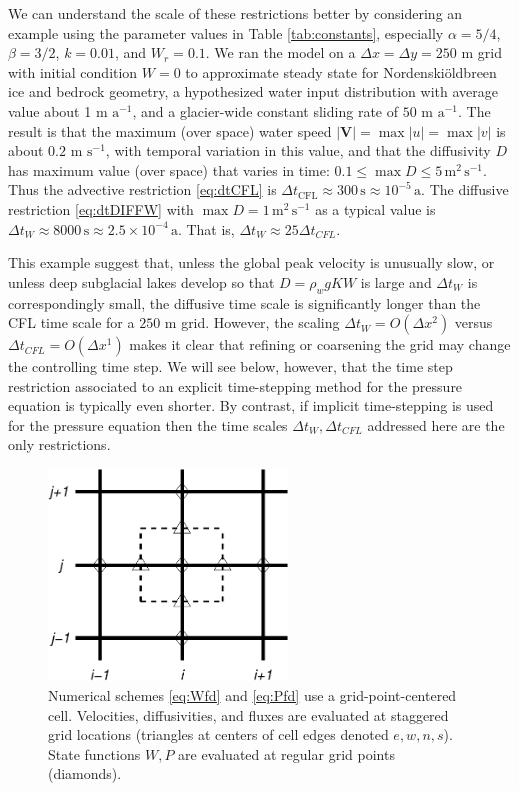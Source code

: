 \documentclass[11pt,final]{amsart}
\newcommand\bV{\mathbf{V}}
\newcommand{\Nbreen}{Nordenski\"oldbreen\xspace}
\begin{document}
We can understand the scale of these restrictions better by considering an example using the parameter values in Table \ref{tab:constants}, especially $\alpha=5/4$, $\beta=3/2$, $k=0.01$, and $W_r=0.1$.  We ran the model on a $\Delta x = \Delta y = 250$ m grid with initial condition $W=0$ to approximate steady state for \Nbreen ice and bedrock geometry, a hypothesized water input distribution with average value about 1 m $\text{a}^{-1}$, and a glacier-wide constant sliding rate of $50$ m $\text{a}^{-1}$.  The result is that the maximum (over space) water speed $|\bV| = \max |u| = \max |v|$ is about $0.2$ m $\text{s}^{-1}$, with temporal variation in this value, and that the diffusivity $D$ has maximum value (over space) that varies in time: $0.1 \le \max D \le 5 \,\text{m}^2\,\text{s}^{-1}$.  Thus the advective restriction \eqref{eq:dtCFL} is $\Delta t_{\text{CFL}} \approx 300\,\text{s} \approx 10^{-5}\,\text{a}$.  The diffusive restriction \eqref{eq:dtDIFFW} with $\max D=1\,\text{m}^2\,\text{s}^{-1}$ as a typical value is $\Delta t_W \approx 8000\,\text{s} \approx 2.5 \times 10^{-4}\,\text{a}$.   That is, $\Delta t_W \approx 25 \Delta t_{CFL}$.

This example suggest that, unless the global peak velocity is unusually slow, or unless deep subglacial lakes develop so that $D = \rho_w g K W$ is large and $\Delta t_W$ is correspondingly small, the diffusive time scale is significantly longer than the CFL time scale for a $250$ m grid.  However, the scaling $\Delta t_W = O(\Delta x^2)$ versus $\Delta t_{CFL} = O(\Delta x^1)$ makes it clear that refining or coarsening the grid may change the controlling time step.  We will see below, however, that the time step restriction associated to an explicit time-stepping method for the pressure equation is typically even shorter.  By contrast, if implicit time-stepping is used for the pressure equation \cite{Hewittetal2012,Schoofetal2012} then the time scales $\Delta t_W, \Delta t_{CFL}$ addressed here are the only restrictions.

\begin{figure}[ht]
\centering
\includegraphics[width=2.5in,keepaspectratio=true]{diffstencil}
\bigskip
\caption{Numerical schemes \eqref{eq:Wfd} and \eqref{eq:Pfd} use a grid-point-centered cell.  Velocities, diffusivities, and fluxes are evaluated at staggered grid locations (triangles at centers of cell edges denoted $e,w,n,s$).  State functions $W,P$ are evaluated at regular grid points (diamonds).}
\label{fig:stencil}
\end{figure}
\end{document}
